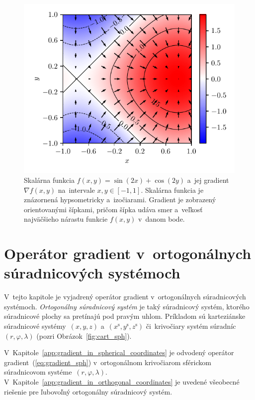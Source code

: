 \documentclass[a4paper, 12pt]{book}
\begin{document}
\begin{figure}[bt]
\centering
\includegraphics{./fig-gradient.pdf}
\caption{Skalárna funkcia $f(x, y) = \sin(2x) + \cos(2y)$ a~jej gradient 
$\nabla f(x, y)$ na~intervale $x, y \in [-1, 1]$.  Skalárna funkcia je 
znázornená hypsometricky a~izočiarami.  Gradient je zobrazený orientovanými 
šípkami, pričom šípka udáva smer a~veľkosť najväčšieho nárastu funkcie $f(x, 
y)$ v~danom bode.}
\label{fig:f_gradf}
\end{figure}






\chapter{Operátor gradient v~ortogonálnych súradnicových systémoch}
\label{app:gradient_in_orthogonal_systems}

V~tejto kapitole je vyjadrený operátor gradient v~ortogonálnych súradnicových 
systémoch.  \emph{Ortogonálny súradnicový systém} je taký súradnicový systém, 
ktorého súradnicové plochy sa pretínajú pod pravým uhlom.  Príkladom sú 
karteziánske súradnicové systémy~$(x, y, z)$ a~$(x^\mathrm{s}, y^\mathrm{s}, 
z^\mathrm{s})$ či~krivočiary systém súradníc~$(r, \varphi, \lambda)$ (pozri 
Obrázok~\ref{fig:cart_sph}).

V~Kapitole~\ref{app:gradient_in_spherical_coordinates} je odvodený operátor 
gradient~(\ref{eq:gradient_sph}) v~ortogonálnom krivočiarom sférickom 
súradnicovom systéme~$(r, \varphi, \lambda)$.  
V~Kapitole~\ref{app:gradient_in_orthogonal_coordinates} je uvedené všeobecné 
riešenie pre ľubovoľný ortogonálny súradnicový systém.
\end{document}
